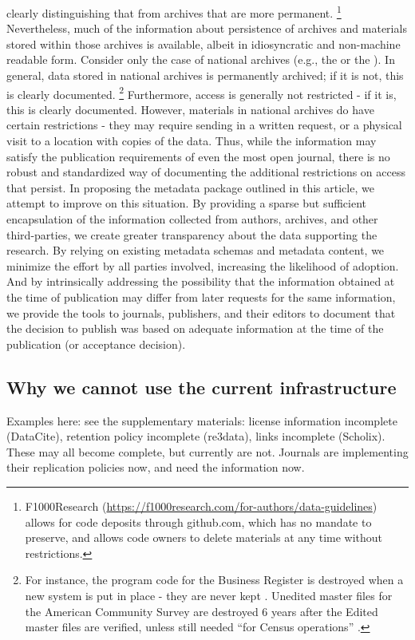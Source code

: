 clearly distinguishing that from archives that are more permanent.%
\footnote{F1000Research (\url{https://f1000research.com/for-authors/data-guidelines}) allows for code deposits through github.com, which has no mandate to preserve, and allows code owners to delete materials at any time without restrictions.}
Nevertheless, much of the information about persistence of archives and
materials stored within those archives is available, albeit in
idiosyncratic and non-machine readable form. Consider only the case of
national archives (e.g., the  or the ). 
In general, data stored in national archives is
permanently archived; if it is not, this is clearly documented.%
\footnote{For instance, the program code for the Business Register is destroyed when a new system is put in place - they are never kept \parencite{U.S.CensusBureauRecordsControlSchedule2009}. Unedited master files for the American Community Survey are destroyed 6 years after the Edited master files are verified, unless still needed ``for Census operations'' \parencite{U.S.CensusBureauRecordsControlSchedule1999}.}
Furthermore, access is generally not restricted - if it is, this is
clearly documented. However, materials in national archives do have
certain restrictions - they may require sending in a written request, or
a physical visit to a location with copies of the data. Thus, while the
information may satisfy the publication requirements of even the most
open journal, there is no robust and standardized way of documenting the
additional restrictions on access that persist. In proposing the
metadata package outlined in this article, we attempt to improve on this
situation. By providing a sparse but sufficient encapsulation of the
information collected from authors, archives, and other third-parties,
we create greater transparency about the data supporting the research.
By relying on existing metadata schemas and metadata content, we
minimize the effort by all parties involved, increasing the likelihood
of adoption. And by intrinsically addressing the possibility that the
information obtained at the time of publication may differ from later
requests for the same information, we provide the tools to journals,
publishers, and their editors to document that the decision to publish
was based on adequate information at the time of the publication (or
acceptance decision).

\subsection{Why we cannot use the current infrastructure}
Examples here: see the supplementary materials: license information incomplete (DataCite), retention policy incomplete (re3data), links incomplete (Scholix). These may all become complete, but currently are not. Journals are implementing their replication policies now, and need the information now.